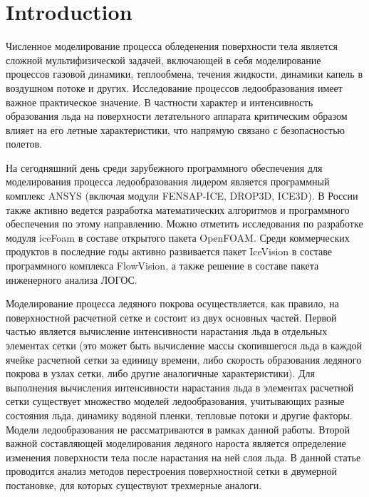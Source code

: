 \documentclass[
11pt,%
tightenlines,%
twoside,%
onecolumn,%
nofloats,%
nobibnotes,%
nofootinbib,%
superscriptaddress,%
noshowpacs,%
centertags]%
{revtex4}
\begin{document}


\maketitle



\section{Introduction}

Численное моделирование процесса обледенения поверхности тела является сложной мультифизической задачей, включающей в себя моделирование процессов газовой динамики, теплообмена, течения жидкости, динамики капель в воздушном потоке и других.
Исследование процессов ледообразования имеет важное практическое значение.
В частности характер и интенсивность образования льда на поверхности летательного аппарата критическим образом влияет на его летные характеристики, что напрямую связано с безопасностью полетов.

На сегодняшний день среди зарубежного программного обеспечения для моделирования процесса ледообразования лидером является программный комплекс ANSYS (включая модули FENSAP-ICE, DROP3D, ICE3D).
В России также активно ведется разработка математических алгоритмов и программного обеспечения по этому направлению.
Можно отметить исследования по разработке модуля iceFoam в составе открытого пакета OpenFOAM.
Среди коммерческих продуктов в последние годы активно развивается пакет IceVision в составе программного комплекса FlowVision, а также решение в составе пакета инженерного анализа ЛОГОС.

Моделирование процесса ледяного покрова осуществляется, как правило, на поверхностной расчетной сетке и состоит из двух основных частей.
Первой частью является вычисление интенсивности нарастания льда в отдельных элементах сетки (это может быть вычисление массы скопившегося льда в каждой ячейке расчетной сетки за единицу времени, либо скорость образования ледяного покрова в узлах сетки, либо другие аналогичные характеристики).
Для выполнения вычисления интенсивности нарастания льда в элементах расчетной сетки существует множество моделей ледообразования, учитывающих разные состояния льда, динамику водяной пленки, тепловые потоки и другие факторы.
Модели ледообразования не рассматриваются в рамках данной работы.
Второй важной составляющей моделирования ледяного нароста является определение изменения поверхности тела после нарастания на ней слоя льда.
В данной статье проводится анализ методов перестроения поверхностной сетки в двумерной постановке, для которых существуют трехмерные аналоги.
\end{document}

